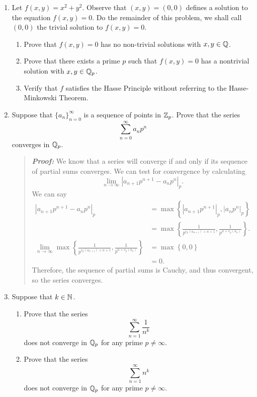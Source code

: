 \documentclass{hw}
\begin{document}
\begin{enumerate}
	\item Let $f(x,y)=x^2 + y^2$. Observe that $(x,y)=(0,0)$ defines a solution to the equation $f(x,y)=0$. Do the remainder of this problem, we shall call $(0,0)$ the trivial solution to $f(x,y)=0$.
	      \begin{enumerate}
	      	\item Prove that $f(x,y)=0$ has no non-trivial solutions with $x,y\in\mathbb{Q}$.
	      	\item Prove that there exists a prime $p$ such that $f(x,y)=0$ has a nontrivial solution with $x,y\in\mathbb{Q}_{p}$.
	      	\item Verify that $f$ satisfies the Hasse Principle without referring to the Hasse-Minkowski Theorem.
	      \end{enumerate}

	\item Suppose that $\{ a_{n} \}_{n=0}^{\infty}$ is a sequence of points in $\mathbb{Z}_{p}$. Prove that the series
	      \[
	      	\sum_{n=0}^{\infty}a_{n}p^{n}
	      \]
	      converges in $\mathbb{Q}_{p}$.
	      \begin{quote}
	      		\textit{\textbf{Proof:}} We know that a series will converge if and only if its sequence of partial sums converges. We can test for convergence by calculating
				\[
					\lim_{n\to\infty}\left|a_{n+1}p^{n+1}-a_{n}p^{n}\right|_{p}.
				\]
				We can say
				\begin{align*}
					\left|a_{n+1}p^{n+1}-a_{n}p^{n}\right|_{p} &= \max\left\{%
						\left|a_{n+1}p^{n+1}\right|_{p},\left|a_{n}p^{n}\right|_{p}%
					\right\}\\
					&= \max\left\{%
						\frac{1}{p^{v_{p}(a_{n+1}) + n + 1}}, \frac{1}{p^{n+v_{p}(a_{n})}}%
					\right\}.\\
					\lim_{n\to\infty}\max\left\{%
						\frac{1}{p^{v_{p}(a_{n+1}) + n + 1}}, \frac{1}{p^{n+v_{p}(a_{n})}}%
					\right\} &= \max\left\{0,0\right\}\\
					&= 0.
				\end{align*}
				Therefore, the sequence of partial sums is Cauchy, and thus convergent, so the series converges.
	      \end{quote}

	\item Suppose that $k\in\mathbb{N}$.
	      \begin{enumerate}
	      	\item Prove that the series
	      	      \[
	      	      	\sum_{n=1}^{\infty}\frac{1}{n^{k}}
	      	      \]
	      	      does not converge in $\mathbb{Q}_{p}$ for any prime $p\neq\infty$.

	      	\item Prove that the series
	      	      \[
	      	      	\sum_{n=1}^{\infty}n^{k}
	      	      \]
	      	      does not converge in $\mathbb{Q}_{p}$ for any prime $p\neq\infty$.
	      \end{enumerate}
\end{enumerate}
\end{document}
